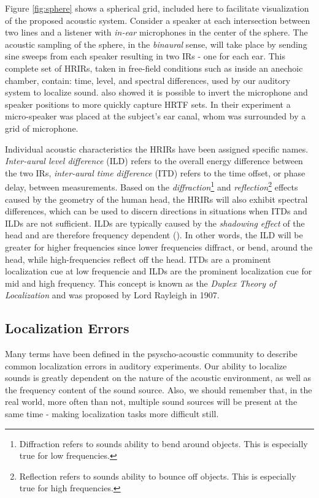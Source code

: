 Figure \ref{fig:sphere} shows a spherical grid, included here to facilitate visualization of the proposed acoustic system. Consider a speaker at each intersection between two lines and a listener with \textit{in-ear} microphones in the center of the sphere. The acoustic sampling of the sphere, in the \textit{binaural} sense, will take place by sending sine sweeps from each speaker resulting in two IRs - one for each ear. This complete set of HRIRs, taken in free-field conditions such as inside an anechoic chamber, contain: time, level, and spectral differences, used by our auditory system to localize sound. \cite{zotkin2006fast} also showed it is possible to invert the microphone and speaker positions to more quickly capture HRTF sets. In their experiment a micro-speaker was placed at the subject's ear canal, whom was surrounded by a grid of microphone. 

Individual acoustic characteristics the HRIRs have been assigned specific names. \textit{Inter-aural level difference} (ILD) refers to the overall energy difference between the two IRs, \textit{inter-aural time difference} (ITD) refers to the time offset, or phase delay, between measurements. Based on the \textit{diffraction}\footnote{Diffraction refers to sounds ability to bend around objects. This is especially true for low frequencies.} and \textit{reflection}\footnote{Reflection refers to sounds ability to bounce off objects. This is especially true for high frequencies.} effects caused by the geometry of the human head, the HRIRs will also exhibit spectral differences, which can be used to discern directions in situations when ITDs and ILDs are not sufficient. ILDs are typically caused by the \textit{shadowing effect} of the head and are therefore frequency dependent (\cite{cuevas20193d}). In other words, the ILD will be greater for higher frequencies since lower frequencies diffract, or bend, around the head, while high-frequencies reflect off the head. ITDs are a prominent localization cue at low frequencie and ILDs are the prominent localization cue for mid and high frequency. This concept is known as the \textit{Duplex Theory of Localization} and was proposed by Lord Rayleigh in 1907. 

\subsection{Localization Errors}

Many terms have been defined in the psyscho-acoustic community to describe common localization errors in auditory experiments. Our ability to localize sounds is greatly dependent on the nature of the acoustic environment, as well as the frequency content of the sound source. Also, we should remember that, in the real world, more often than not, multiple sound sources will be present at the same time - making localization tasks more difficult still.

